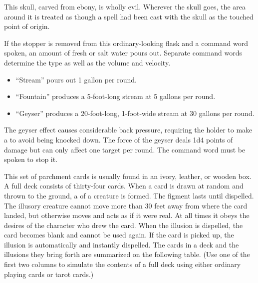 {\begin{comment}
If a side is pressed twice in quick succession, the character so doing is transported to a random point on the other plane, along with all creatures in adjacent squares. (The other creatures may avoid this fate by succeeding on DC 23 Will saves).

Strong conjuration; CL 13th; Craft Wondrous Item, plane shift; Price 164,000 gp.
\end{comment}

 This skull, carved from ebony, is wholly evil. Wherever the skull goes, the area around it is treated as though a  spell had been cast with the skull as the touched point of origin.


 If the stopper is removed from this ordinary-looking flask and a command word spoken, an amount of fresh or salt water pours out. Separate command words determine the type as well as the volume and velocity.
\begin{itemize}
\item ``Stream'' pours out 1 gallon per round.
\item ``Fountain'' produces a 5-foot-long stream at 5 gallons per round.
\item ``Geyser'' produces a 20-foot-long, 1-foot-wide stream at 30 gallons per round.
\end{itemize}

The geyser effect causes considerable back pressure, requiring the holder to make a  to avoid being knocked down. The force of the geyser deals 1d4 points of damage but can only affect one target per round. The command word must be spoken to stop it.


 This set of parchment cards is usually found in an ivory, leather, or wooden box. A full deck consists of thirty-four cards. When a card is drawn at random and thrown to the ground, a  of a creature is formed. The figment lasts until dispelled. The illusory creature cannot move more than 30 feet away from where the card landed, but otherwise moves and acts as if it were real. At all times it obeys the desires of the character who drew the card. When the illusion is dispelled, the card becomes blank and cannot be used again. If the card is picked up, the illusion is automatically and instantly dispelled. The cards in a deck and the illusions they bring forth are summarized on the following table. (Use one of the first two columns to simulate the contents of a full deck using either ordinary playing cards or tarot cards.)

}
